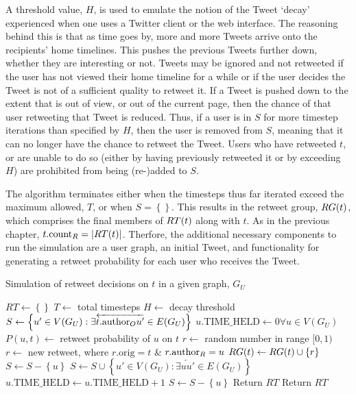 A threshold value, $H$, is used to emulate the notion of the Tweet `decay' experienced when one uses a Twitter client or the web interface. The reasoning behind this is that as time goes by, more and more Tweets arrive onto the recipients' home timelines. This pushes the previous Tweets further down, whether they are interesting or not. Tweets may be ignored and not retweeted if the user has not viewed their home timeline for a while or if the user decides the Tweet is not of a sufficient quality to retweet it. If a Tweet is pushed down to the extent that is out of view, or out of the current page, then the chance of that user retweeting that Tweet is reduced. Thus, if a user is in $S$ for more timestep iterations than specified by $H$, then the user is removed from $S$, meaning that it can no longer have the chance to retweet the Tweet. Users who have retweeted $t$, or are unable to do so (either by having previously retweeted it or by exceeding $H$) are prohibited from being (re-)added to $S$.

The algorithm terminates either when the timesteps thus far iterated exceed the maximum allowed, $T$, or when $S = \left\{\right\}$. This results in the retweet group, $RG(t)$, which comprises the final members of $RT(t)$ along with $t$. As in the previous chapter, $t.\textrm{count}_R = |RT(t)|$. Therfore, the additional necessary components to run the simulation are a user graph, an initial Tweet, and functionality for generating a retweet probability for each user who receives the Tweet.

\begin{algorithm}
\caption{Simulation of retweet decisions on $t$ in a given graph, $G_U$}
\begin{algorithmic}[1]
    \State $RT\gets \left\{\right\}$
    \State $T\gets$ total timesteps
    \State $H\gets$ decay threshold 
    \State $S\gets \left\{u' \in V(G_U) : \exists \overleftarrow{t.\textrm{author}_O u'} \in E(G_U)\right\}$
    \State $u.\textrm{TIME\_HELD}\gets 0 \forall u \in V(G_U)$
    \Statex %
            \State $P(u,t)\gets$ retweet probability of $u$ on $t$
            \State $r\gets$ random number in range $[0,1)$
                \State $r\gets$ new retweet, where $r.\textrm{orig} = t$ \& $r.\textrm{author}_R = u$
                \State $RG(t)\gets RG(t) \cup \left\{r\right\}$
                \State $S\gets S - \left\{u\right\}$
                \State $S\gets S \cup \left\{u' \in V(G_U) : \exists \overleftarrow{u u'} \in E(G_U)\right\}$
            \Else
                \State $u.\textrm{TIME\_HELD}\gets u.\textrm{TIME\_HELD} + 1$
                    \State $S\gets S - \left\{u\right\}$ 
                \EndIf
            \EndIf
        \EndFor
            \State Return $RT$ 
        \EndIf
    \EndFor
    \State Return $RT$
\EndProcedure
\end{algorithmic}
\label{algo1}
\end{algorithm}


